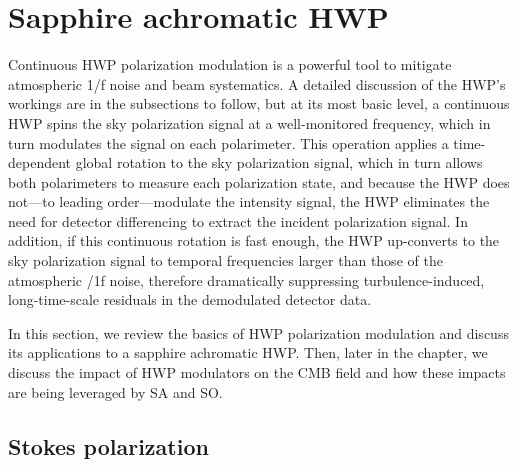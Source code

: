 
\section{Sapphire achromatic HWP}
\label{sec:sapphire_achromatic_hwp}

Continuous HWP polarization modulation is a powerful tool to mitigate atmospheric 1/f noise and beam systematics. A detailed discussion of the HWP's workings are in the subsections to follow, but at its most basic level, a continuous HWP spins the sky polarization signal at a well-monitored frequency, which in turn modulates the signal on each polarimeter. This operation applies a time-dependent global rotation to the sky polarization signal, which in turn allows both polarimeters to measure each polarization state, and because the HWP does not---to leading order---modulate the intensity signal, the HWP eliminates the need for detector differencing to extract the incident polarization signal. In addition, if this continuous rotation is fast enough, the HWP up-converts to the sky polarization signal to temporal frequencies larger than those of the atmospheric /1f noise, therefore dramatically suppressing turbulence-induced, long-time-scale residuals in the demodulated detector data. 

In this section, we review the basics of HWP polarization modulation and discuss its applications to a sapphire achromatic HWP. Then, later in the chapter, we discuss the impact of HWP modulators on the CMB field and how these impacts are being leveraged by SA and SO.


\subsection{Stokes polarization}
\label{sec:stokes_polarization}

